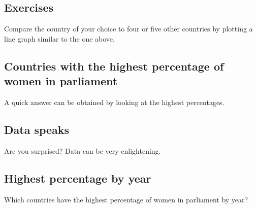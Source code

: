 \documentclass[a4paper,9pt,twocolumn,twoside,printwatermark=true]{pinp}
\begin{document}
\subsection{Exercises}\label{exercises}

Compare the country of your choice to four or five other countries by
plotting a line graph similar to the one above.

\subsection{Countries with the highest percentage of women in
parliament}\label{countries-with-the-highest-percentage-of-women-in-parliament}

A quick answer can be obtained by looking at the highest percentages.

\begin{Shaded}
\begin{Highlighting}[]
\NormalTok{WP[}\NormalTok{(}\OperatorTok{-}\NormalTok{)]}
\end{Highlighting}
\end{Shaded}

\subsection{Data speaks}\label{data-speaks}

Are you surprised? Data can be very enlightening.

\subsection{Highest percentage by
year}\label{highest-percentage-by-year}

Which countries have the highest percentage of women in parliament by
year?
\end{document}
